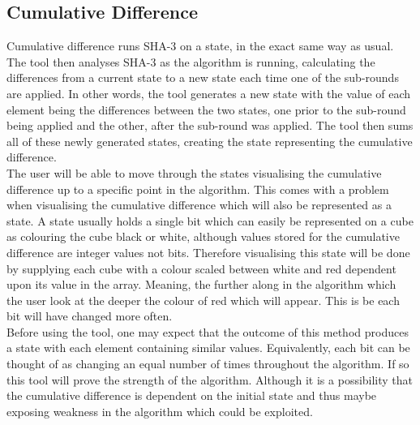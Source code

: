 \subsection{Cumulative Difference}
Cumulative difference runs SHA-3 on a state, in the exact same way as usual. The tool then analyses SHA-3 as the algorithm is running, calculating the differences from a current state to a new state each time one of the sub-rounds are applied. In other words, the tool generates a new state with the value of each element being the differences between the two states, one prior to the sub-round being applied and the other, after the sub-round was applied. The tool then sums all of these newly generated states, creating the state representing the cumulative difference.
\vspace{5 mm}\\
The user will be able to move through the states visualising the cumulative difference up to a specific point in the algorithm. This comes with a problem when visualising the cumulative difference which will also be represented as a state. A state usually holds a single bit which can easily be represented on a cube as colouring the cube black or white, although values stored for the cumulative difference are integer values not bits. Therefore visualising this state will be done by supplying each cube with a colour scaled between white and red dependent upon its value in the array. Meaning, the further along in the algorithm which the user look at the deeper the colour of red which will appear. This is be each bit will have changed more often. 
\vspace{5 mm}\\
Before using the tool, one may expect that the outcome of this method produces a state with each element containing similar values. Equivalently, each bit can be thought of as changing an equal number of times throughout the algorithm. If so this tool will prove the strength of the algorithm. Although it is a possibility that the cumulative difference is dependent on the initial state and thus maybe exposing weakness in the algorithm which could be exploited.
